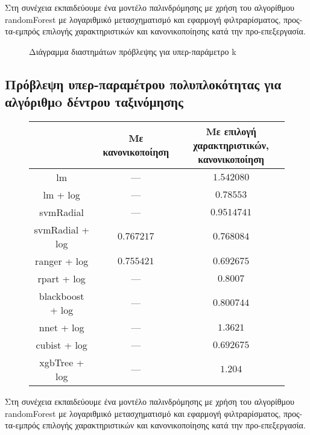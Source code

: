Στη συνέχεια εκπαιδεύουμε ένα μοντέλο παλινδρόμησης με χρήση του αλγορίθμου randomForest με λογαριθμικό μετασχηματισμό και εφαρμογή φιλτραρίσματος, προς-τα-εμπρός επιλογής χαρακτηριστικών και κανονικοποίησης κατά την προ-επεξεργασία.

\begin{figure}[!htb]
		\scalebox{0.85}{
			}
		\caption[Διάγραμμα διαστημάτων πρόβλεψης για υπερ-παράμετρο k]{Διάγραμμα διαστημάτων πρόβλεψης για υπερ-παράμετρο k}
\end{figure}
\FloatBarrier
\subsection{Πρόβλεψη υπερ-παραμέτρου πολυπλοκότητας για αλγόριθμo δέντρου ταξινόμησης} 
\begin{figure}[!htb]
	\footnotesize
	\begin{center}
		\begin{tabular}{ |c|c|c| } 
			\hline
			 & Με κανονικοποίηση & \pbox{20cm}{ Με επιλογή χαρακτηριστικών,\\ κανονικοποίηση} \\
			 \hline
			lm & --- & $1.542080$  \\
			\hline
			lm + log & --- & $0.78553$\\
			\hline
			svmRadial & --- & $0.9514741$\\
			\hline
			svmRadial + log& $0.767217$& $0.768084$\\
			\hline
			ranger + log  &$0.755421$&$\bm{0.692675}$\\
			\hline
			rpart + log & --- &$0.8007$\\
			\hline
			blackboost + log & --- & $0.800744$ \\
			\hline
			nnet + log  & --- & $1.3621$\\
			\hline
			cubist + log & --- & $\bm{0.692675}$ \\
			\hline
			xgbTree + log & --- & $1.204$\\
			\hline
		\end{tabular}   
	\end{center}
\end{figure}

Στη συνέχεια εκπαιδεύουμε ένα μοντέλο παλινδρόμησης με χρήση του αλγορίθμου randomForest με λογαριθμικό μετασχηματισμό και εφαρμογή φιλτραρίσματος, προς-τα-εμπρός επιλογής χαρακτηριστικών και κανονικοποίησης κατά την προ-επεξεργασία.

